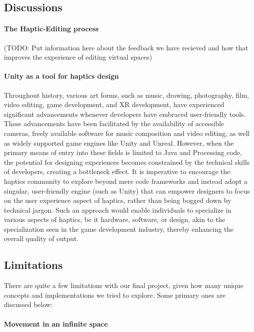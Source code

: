 \subsection{Discussions}

\paragraph{The Haptic-Editing process}

(TODO: Put information here about the feedback we have recieved and how that improves the experience of editing virtual spaces)

\paragraph{Unity as a tool for haptics design}

Throughout history, various art forms, such as music, drawing, photography, film, video editing, game development, and XR development, have experienced significant advancements whenever developers have embraced user-friendly tools. These advancements have been facilitated by the availability of accessible cameras, freely available software for music composition and video editing, as well as widely supported game engines like Unity and Unreal. However, when the primary means of entry into these fields is limited to Java and Processing code, the potential for designing experiences becomes constrained by the technical skills of developers, creating a bottleneck effect. It is imperative to encourage the haptics community to explore beyond mere code frameworks and instead adopt a singular, user-friendly engine (such as Unity) that can empower designers to focus on the user experience aspect of haptics, rather than being bogged down by technical jargon. Such an approach would enable individuals to specialize in various aspects of haptics, be it hardware, software, or design, akin to the specialization seen in the game development industry, thereby enhancing the overall quality of output.

\subsection{Limitations}

There are quite a few limitations with our final project, given how many unique concepts and implementations we tried to explore. Some primary ones are discussed below:

\paragraph{Movement in an infinite space}

